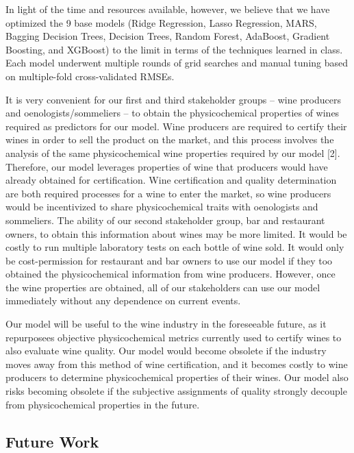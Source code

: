 \documentclass[
  letterpaper,
  DIV=11,
  numbers=noendperiod]{scrartcl}
\begin{document}
In light of the time and resources available, however, we believe that
we have optimized the 9 base models (Ridge Regression, Lasso Regression,
MARS, Bagging Decision Trees, Decision Trees, Random Forest, AdaBoost,
Gradient Boosting, and XGBoost) to the limit in terms of the techniques
learned in class. Each model underwent multiple rounds of grid searches
and manual tuning based on multiple-fold cross-validated RMSEs.

It is very convenient for our first and third stakeholder groups -- wine
producers and oenologists/sommeliers -- to obtain the physicochemical
properties of wines required as predictors for our model. Wine producers
are required to certify their wines in order to sell the product on the
market, and this process involves the analysis of the same
physicochemical wine properties required by our model {[}2{]}.
Therefore, our model leverages properties of wine that producers would
have already obtained for certification. Wine certification and quality
determination are both required processes for a wine to enter the
market, so wine producers would be incentivized to share physicochemical
traits with oenologists and sommeliers. The ability of our second
stakeholder group, bar and restaurant owners, to obtain this information
about wines may be more limited. It would be costly to run multiple
laboratory tests on each bottle of wine sold. It would only be
cost-permission for restaurant and bar owners to use our model if they
too obtained the physicochemical information from wine producers.
However, once the wine properties are obtained, all of our stakeholders
can use our model immediately without any dependence on current events.

Our model will be useful to the wine industry in the foreseeable future,
as it repurposees objective physicochemical metrics currently used to
certify wines to also evaluate wine quality. Our model would become
obsolete if the industry moves away from this method of wine
certification, and it becomes costly to wine producers to determine
physicochemical properties of their wines. Our model also risks becoming
obsolete if the subjective assignments of quality strongly decouple from
physicochemical properties in the future.

\hypertarget{future-work}{%
\subsection{Future Work}\label{future-work}}
\end{document}
